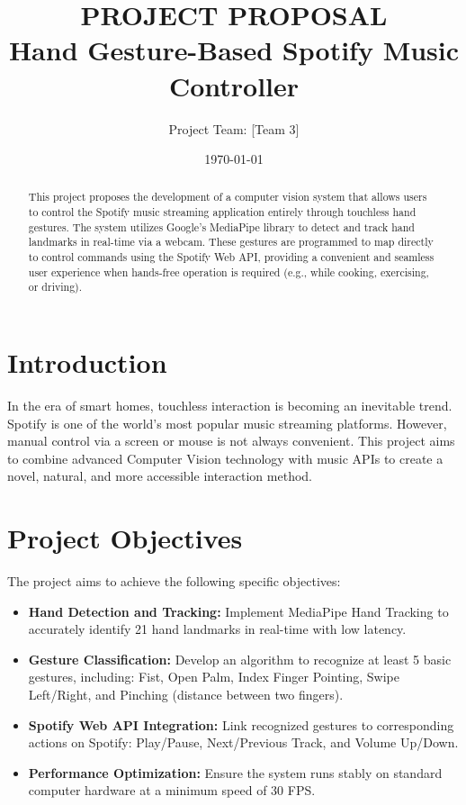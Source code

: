 \documentclass[12pt,a4paper]{article}
\title{\textbf{PROJECT PROPOSAL}\\ 
\Large Hand Gesture-Based Spotify Music Controller}
\author{Project Team: [Team 3]}
\date{\today}
\begin{document}
\maketitle

\begin{abstract}
This project proposes the development of a computer vision system that allows users to control the Spotify music streaming application entirely through touchless hand gestures. The system utilizes Google's MediaPipe library to detect and track hand landmarks in real-time via a webcam. These gestures are programmed to map directly to control commands using the Spotify Web API, providing a convenient and seamless user experience when hands-free operation is required (e.g., while cooking, exercising, or driving).
\end{abstract}

\tableofcontents
\newpage

\section{Introduction}
In the era of smart homes, touchless interaction is becoming an inevitable trend. Spotify is one of the world's most popular music streaming platforms. However, manual control via a screen or mouse is not always convenient. This project aims to combine advanced Computer Vision technology with music APIs to create a novel, natural, and more accessible interaction method.

\section{Project Objectives}
The project aims to achieve the following specific objectives:
\begin{itemize}[label=\textbullet]
    \item \textbf{Hand Detection and Tracking:} Implement MediaPipe Hand Tracking to accurately identify 21 hand landmarks in real-time with low latency.
    \item \textbf{Gesture Classification:} Develop an algorithm to recognize at least 5 basic gestures, including: Fist, Open Palm, Index Finger Pointing, Swipe Left/Right, and Pinching (distance between two fingers).
    \item \textbf{Spotify Web API Integration:} Link recognized gestures to corresponding actions on Spotify: Play/Pause, Next/Previous Track, and Volume Up/Down.
    \item \textbf{Performance Optimization:} Ensure the system runs stably on standard computer hardware at a minimum speed of 30 FPS.
\end{itemize}
\end{document}
